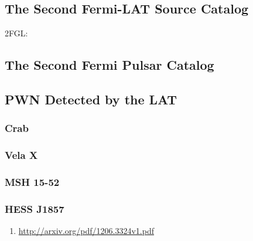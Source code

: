 \subsection{The Second Fermi-LAT Source Catalog}

2FGL: \cite{second_lat_catalog_2012}

\subsection{The Second Fermi Pulsar Catalog}

\subsection{PWN Detected by the LAT}

\subsubsection{Crab}

\subsubsection{Vela X}

\subsubsection{MSH 15-52}

\subsubsection{HESS J1857}


\begin{enumerate}
  \item \url{http://arxiv.org/pdf/1206.3324v1.pdf}
\end{enumerate}
